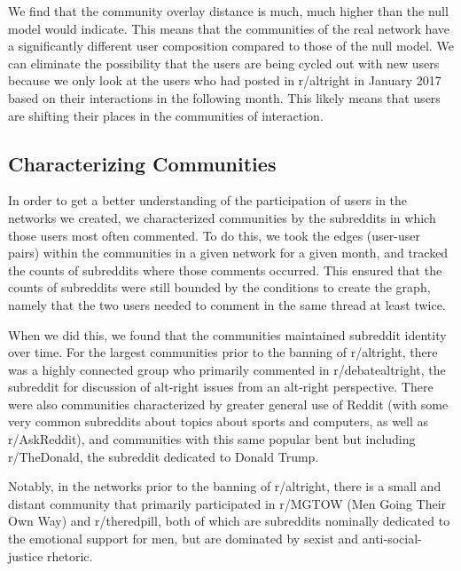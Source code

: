 \documentclass[twoside,twocolumn]{article}
\begin{document}

We find that the community overlay distance is much, much higher than the null model would indicate. This means that the communities of the real network have a significantly different user composition compared to those of the null model. We can eliminate the possibility that the users are being cycled out with new users because we only look at the users who had posted in r/altright in January 2017 based on their interactions in the following month. This likely means that users are shifting their places in the communities of interaction. 


\subsection{Characterizing Communities}

In order to get a better understanding of the participation of users in the networks we created, we characterized communities by the subreddits in which those users most often commented. To do this, we took the edges (user-user pairs) within the communities in a given network for a given month, and tracked the counts of subreddits where those comments occurred. This ensured that the counts of subreddits were still bounded by the conditions to create the graph, namely that the two users needed to comment in the same thread at least twice. 

When we did this, we found that the communities maintained subreddit identity over time. For the largest communities prior to the banning of r/altright, there was a highly connected group who primarily commented in r/debatealtright, the subreddit for discussion of alt-right issues from an alt-right perspective. There were also communities characterized by greater general use of Reddit (with some very common subreddits about topics about sports and computers, as well as r/AskReddit), and communities with this same popular bent but including r/The\textunderscore Donald, the subreddit dedicated to Donald Trump. 

Notably, in the networks prior to the banning of r/altright, there is a small and distant community that primarily participated in r/MGTOW (Men Going Their Own Way) and r/theredpill, both of which are subreddits nominally dedicated to the emotional support for men, but are dominated by sexist and anti-social-justice rhetoric. 
\end{document}
